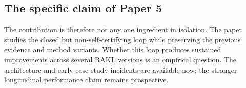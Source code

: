 \subsection{The specific claim of Paper 5}

The contribution is therefore not any one ingredient in isolation. The paper studies the closed but non-self-certifying loop
while preserving the previous evidence and method variants. Whether this loop produces sustained improvements across several RAKL versions is an empirical question. The architecture and early case-study incidents are available now; the stronger longitudinal performance claim remains prospective.